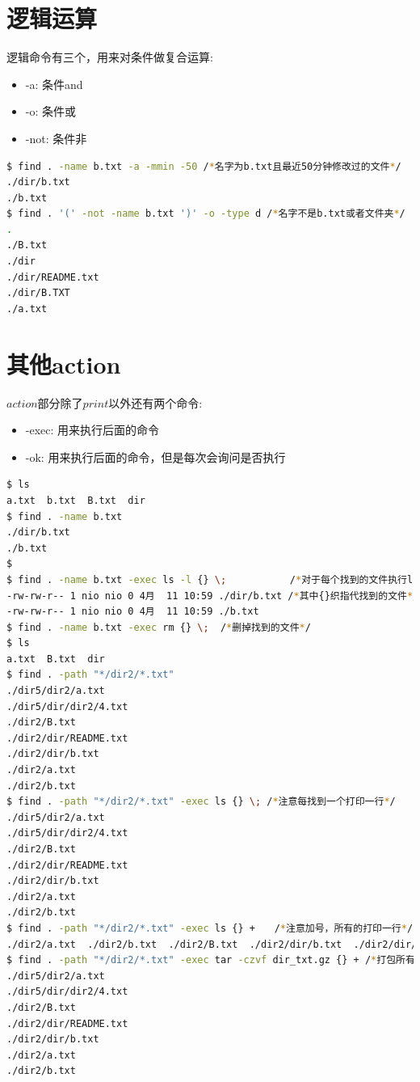 \documentclass{article}
\begin{document}
\section{逻辑运算}
逻辑命令有三个，用来对条件做复合运算: \par
\begin{itemize}
	\item -a: 条件and
	\item -o: 条件或
	\item -not: 条件非
\end{itemize}
\begin{lstlisting}[language=bash]
$ find . -name b.txt -a -mmin -50 /*名字为b.txt且最近50分钟修改过的文件*/
./dir/b.txt
./b.txt
$ find . '(' -not -name b.txt ')' -o -type d /*名字不是b.txt或者文件夹*/
.
./B.txt
./dir
./dir/README.txt
./dir/B.TXT
./a.txt
\end{lstlisting}

\section{其他action}
$action$部分除了$print$以外还有两个命令: \par
\begin{itemize}
	\item -exec: 用来执行后面的命令
	\item -ok: 用来执行后面的命令，但是每次会询问是否执行
\end{itemize}
\begin{lstlisting}[language=bash]
$ ls
a.txt  b.txt  B.txt  dir
$ find . -name b.txt 
./dir/b.txt
./b.txt
$ 
$ find . -name b.txt -exec ls -l {} \;           /*对于每个找到的文件执行ls -l*/
-rw-rw-r-- 1 nio nio 0 4月  11 10:59 ./dir/b.txt /*其中{}织指代找到的文件*/
-rw-rw-r-- 1 nio nio 0 4月  11 10:59 ./b.txt
$ find . -name b.txt -exec rm {} \;  /*删掉找到的文件*/
$ ls
a.txt  B.txt  dir
$ find . -path "*/dir2/*.txt"
./dir5/dir2/a.txt
./dir5/dir/dir2/4.txt
./dir2/B.txt
./dir2/dir/README.txt
./dir2/dir/b.txt
./dir2/a.txt
./dir2/b.txt
$ find . -path "*/dir2/*.txt" -exec ls {} \; /*注意每找到一个打印一行*/
./dir5/dir2/a.txt
./dir5/dir/dir2/4.txt
./dir2/B.txt
./dir2/dir/README.txt
./dir2/dir/b.txt
./dir2/a.txt
./dir2/b.txt
$ find . -path "*/dir2/*.txt" -exec ls {} +　　/*注意加号，所有的打印一行*/
./dir2/a.txt  ./dir2/b.txt  ./dir2/B.txt  ./dir2/dir/b.txt  ./dir2/dir/README.txt  ./dir5/dir2/a.txt  ./dir5/dir/dir2/4.txt
$ find . -path "*/dir2/*.txt" -exec tar -czvf dir_txt.gz {} + /*打包所有找到的文件*/
./dir5/dir2/a.txt
./dir5/dir/dir2/4.txt
./dir2/B.txt
./dir2/dir/README.txt
./dir2/dir/b.txt
./dir2/a.txt
./dir2/b.txt

\end{lstlisting}
\end{document}
